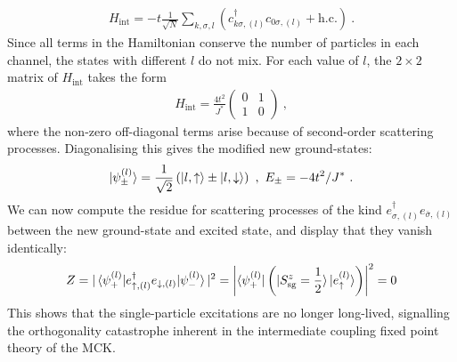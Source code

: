 \documentclass[12pt]{iopart}
\begin{document}
\begin{equation}\begin{aligned}
	H_\text{int} = -t\frac{1}{\sqrt N}\sum_{k,\sigma,l}\left( c^\dagger_{k\sigma,(l)}c_{0\sigma,(l)} + \text{h.c.} \right)~.
\end{aligned}\end{equation}
Since all terms in the Hamiltonian conserve the number of particles in each channel, the states with different \(l\) do not mix. For each value of \(l\), the \(2\times 2\) matrix of \(H_\text{int}\) takes the form
\begin{equation}\begin{aligned}
	H_\text{int} = \frac{4t^2}{J^*}\begin{pmatrix} 0 & 1 \\ 1 & 0 \end{pmatrix} ~,
\end{aligned}\end{equation}
where the non-zero off-diagonal terms arise because of second-order scattering processes. Diagonalising this gives the modified new ground-states:
\begin{equation}\begin{aligned}
	\ket{\psi_\pm^{(l)}} = \frac{1}{\sqrt 2}\left(\ket{l,\uparrow} \pm \ket{l,\downarrow}\right)~,~ E_\pm = -4t^2/J^*~.
\end{aligned}\end{equation}
We can now compute the residue for scattering processes of the kind \(e^\dagger_{\sigma,(l)} e_{\bar\sigma,(l)}\) between the new ground-state and excited state, and display that they vanish identically:
\begin{equation}\begin{aligned}
	Z = |\braket{\psi_+^{(l)}| e^\dagger_{\uparrow,(l)} e_{\downarrow,(l)} | \psi_-^{(l)}}|^2 = \left|\bra{\psi_+^{(l)}}\left(\ket{S_\text{sg}^z=\frac{1}{2}}\ket{e_\uparrow^{(l)}}\right)\right|^2 = 0
\end{aligned}\end{equation}
This shows that the single-particle excitations are no longer long-lived, signalling the orthogonality catastrophe inherent in the intermediate coupling fixed point theory of the MCK.
\end{document}
